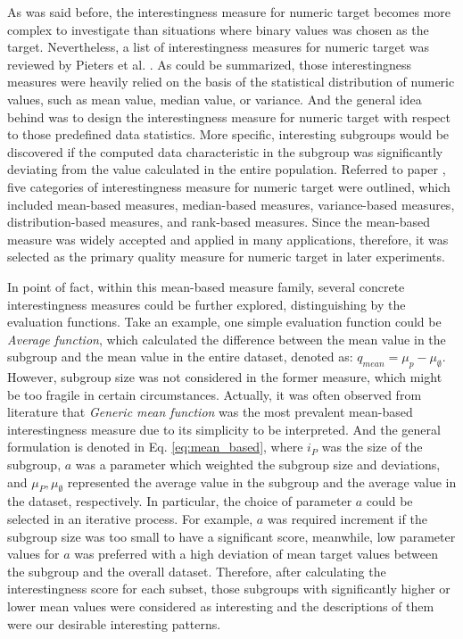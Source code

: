 As was said before, the interestingness measure for numeric target becomes more complex to investigate than situations where binary values was chosen as the target. Nevertheless, a list of interestingness measures for numeric target was reviewed by Pieters et al. \cite{pieters2010subgroup}. As could be summarized, those interestingness measures were heavily relied on the basis of the statistical distribution of numeric values, such as mean value, median value, or variance. And the general idea behind was to design the interestingness measure for numeric target with respect to those predefined data statistics. More specific, interesting subgroups would be discovered if the computed data characteristic in the subgroup was significantly deviating from the value calculated in the entire population. Referred to paper \cite{lemmerich2014novel}, five categories of interestingness measure for numeric target were outlined, which included mean-based measures, median-based measures, variance-based measures, distribution-based measures, and rank-based measures. Since the mean-based measure was widely accepted and applied in many applications, therefore, it was selected as the primary quality measure for numeric target in later experiments. 

In point of fact, within this mean-based measure family, several concrete interestingness measures could be further explored, distinguishing by the evaluation functions. Take an example, one simple evaluation function could be \textit{Average function}, which calculated the difference between the mean value in the subgroup and the mean value in the entire dataset, denoted as: $q_{mean} = \mu_p - \mu_{\emptyset}$. However, subgroup size was not considered in the former measure, which might be too fragile in certain circumstances. Actually, it was often observed from literature that \textit{Generic mean function} was the most prevalent mean-based interestingness measure due to its simplicity to be interpreted. And the general formulation is denoted in Eq. \ref{eq:mean_based}, where $i_{P}$ was the size of the subgroup, $a$ was a parameter which weighted the subgroup size and deviations, and $\mu_{P}, \mu_{\emptyset}$ represented the average value in the subgroup and the average value in the dataset, respectively. In particular, the choice of parameter $a$ could be selected in an iterative process. For example, $a$ was required increment if the subgroup size was too small to have a significant score, meanwhile, low parameter values for $a$ was preferred with a high deviation of mean target values between the subgroup and the overall dataset. Therefore, after calculating the interestingness score for each subset, those subgroups with significantly higher or lower mean values were considered as interesting and the descriptions of them were our desirable interesting patterns. 

